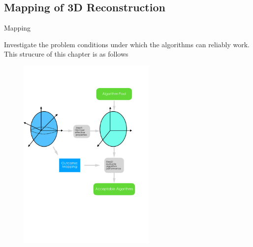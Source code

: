 \documentclass[10pt]{beamer}
\begin{document}
\subsection{Mapping of 3D Reconstruction}
\begin{frame}{Mapping}

Investigate the problem conditions under which the algorithms can reliably work. This strucure of this chapter is as follows

\begin{figure}
\centering
\includegraphics[width=0.6\textwidth]{images/mapping_3d_vision.pdf}
\end{figure}


\end{frame}
\end{document}

